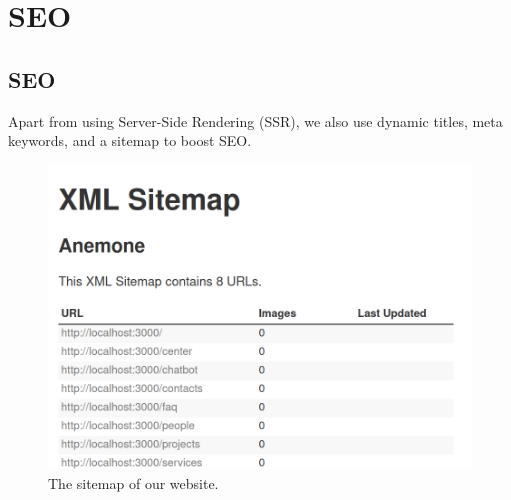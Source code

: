 
\section{SEO}
\subsection{SEO}
Apart from using Server-Side Rendering (SSR), we also use dynamic titles, meta keywords, and a sitemap to boost SEO.
\begin{figure}[h]
	\centering
	\includegraphics[width=\linewidth]{Resources/sitemap.png}
	\caption{The sitemap of our website.}
	\label{fig:example}
\end{figure}